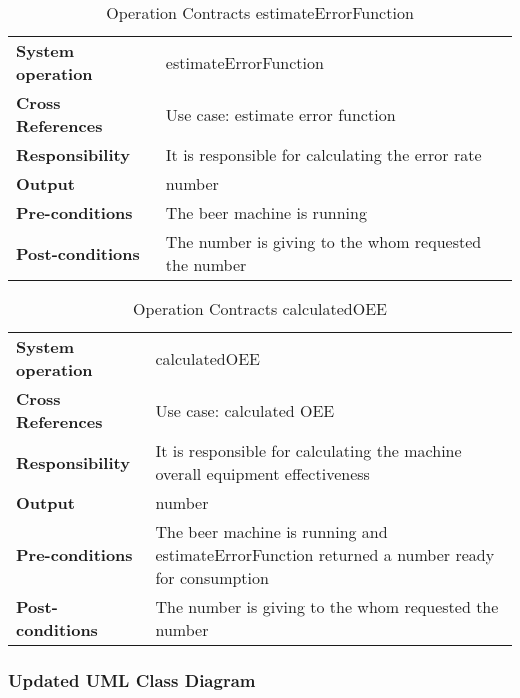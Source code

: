 \begin{table}[H]
    \begin{tabularx}{\textwidth}{|>{\RaggedRight}p{3.7cm}|>{\RaggedRight}X|}
        \hline
        \multicolumn{2}{|c|}{\textbf{estimateErrorFunction}}\\
        \hline
        \textbf{System operation} & estimateErrorFunction\\
        \hline
        \textbf{Cross References} & Use case: estimate error function\\
        \hline
        \textbf{Responsibility} & It is responsible for calculating the error rate\\
        \hline
        \textbf{Output} & number \\
        \hline
        \textbf{Pre-conditions} & The beer machine is running \\
        \hline
        \textbf{Post-conditions} & The number is giving to the whom requested 
        the number \\
        \hline
    \end{tabularx}
    \caption{Operation Contracts estimateErrorFunction} 
    \label{table:Operation_Contracts_estimateErrorFunction}
\end{table}


\begin{table}[H]
    \begin{tabularx}{\textwidth}{|>{\RaggedRight}p{3.7cm}|>{\RaggedRight}X|}
        \hline
        \multicolumn{2}{|c|}{\textbf{calculatedOEE}}\\
        \hline
        \textbf{System operation} & calculatedOEE\\
        \hline
        \textbf{Cross References} & Use case: calculated OEE\\
        \hline
        \textbf{Responsibility} & It is responsible for calculating the machine
        overall equipment effectiveness\\
        \hline
        \textbf{Output} & number\\
        \hline
        \textbf{Pre-conditions} & The beer machine is running and estimateErrorFunction
        returned a number ready for consumption \\
        \hline
        \textbf{Post-conditions} & The number is giving to the whom requested 
        the number \\
        \hline
    \end{tabularx}
    \caption{Operation Contracts calculatedOEE} 
    \label{table:Operation_Contracts_calculatedOEE}
\end{table}

\subsubsection{Updated UML Class Diagram}
